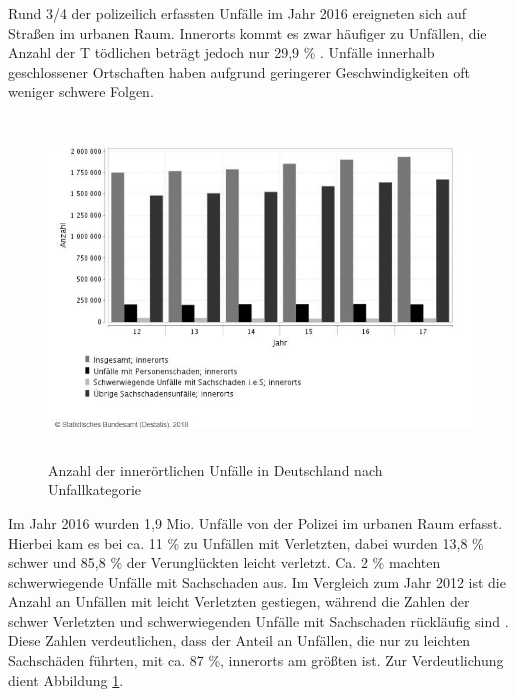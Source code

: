 Rund 3/4 der polizeilich erfassten Unfälle im Jahr 2016 ereigneten sich auf Straßen im urbanen Raum. Innerorts kommt es zwar häufiger zu Unfällen, die Anzahl der T
tödlichen beträgt jedoch nur 29,9 \% \parencite[S. 149]{StatistischesBundesamt.2018}. Unfälle innerhalb geschlossener Ortschaften haben aufgrund geringerer Geschwindigkeiten oft weniger schwere Folgen.

\begin{savenotes}
	\begin{figure}[H]
		\centering
		\includegraphics[width=12cm,height=9cm]{figures/Schaden}
		\caption[Anzahl der innerörtlichen Unfälle in Deutschland nach Unfallkategorie]{Anzahl der innerörtlichen Unfälle in Deutschland nach Unfallkategorie \parencite{StatistischesBundesamt.2018d}}\label{fig:Schaden}
	\end{figure}
\end{savenotes}

Im Jahr 2016 wurden 1,9 Mio. Unfälle von der Polizei im urbanen Raum erfasst. Hierbei kam es bei ca. 11 \% zu Unfällen mit Verletzten, dabei wurden 13,8 \% schwer und 85,8 \% der Verunglückten leicht verletzt. Ca. 2 \% machten schwerwiegende Unfälle mit Sachschaden aus. Im Vergleich zum Jahr 2012 ist die Anzahl an Unfällen mit leicht Verletzten gestiegen, während die Zahlen der schwer Verletzten und schwerwiegenden Unfälle mit Sachschaden rückläufig sind \parencite[S. 21]{StatistischesBundesamt.2018c}. Diese Zahlen verdeutlichen, dass der Anteil an Unfällen, die nur zu leichten Sachschäden führten, mit ca. 87 \%, innerorts am größten ist. Zur Verdeutlichung dient Abbildung \ref{fig:Schaden}.

